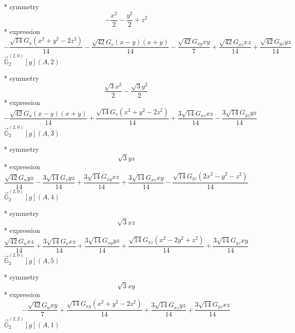 \documentclass[fleqn,8pt]{jsarticle}
\begin{document}
\noindent\quad ** symmetry
\begin{dmath*}
- \frac{x^{2}}{2} - \frac{y^{2}}{2} + z^{2}
\end{dmath*}
\noindent\quad ** expression
\begin{dmath*}
- \frac{\sqrt{14} G_{u} \left(x^{2} + y^{2} - 2 z^{2}\right)}{14} - \frac{\sqrt{42} G_{v} \left(x - y\right) \left(x + y\right)}{14} - \frac{\sqrt{42} G_{xy} x y}{7} + \frac{\sqrt{42} G_{xz} x z}{14} + \frac{\sqrt{42} G_{yz} y z}{14}
\end{dmath*}
\noindent\quad $\vec{\mathbb{G}}_{2}^{(2,0)}[g](A,2)$

\noindent\quad ** symmetry
\begin{dmath*}
\frac{\sqrt{3} x^{2}}{2} - \frac{\sqrt{3} y^{2}}{2}
\end{dmath*}
\noindent\quad ** expression
\begin{dmath*}
- \frac{\sqrt{42} G_{u} \left(x - y\right) \left(x + y\right)}{14} + \frac{\sqrt{14} G_{v} \left(x^{2} + y^{2} - 2 z^{2}\right)}{14} + \frac{3 \sqrt{14} G_{xz} x z}{14} - \frac{3 \sqrt{14} G_{yz} y z}{14}
\end{dmath*}
\noindent\quad $\vec{\mathbb{G}}_{2}^{(2,0)}[g](A,3)$

\noindent\quad ** symmetry
\begin{dmath*}
\sqrt{3} y z
\end{dmath*}
\noindent\quad ** expression
\begin{dmath*}
\frac{\sqrt{42} G_{u} y z}{14} - \frac{3 \sqrt{14} G_{v} y z}{14} + \frac{3 \sqrt{14} G_{xy} x z}{14} + \frac{3 \sqrt{14} G_{xz} x y}{14} - \frac{\sqrt{14} G_{yz} \left(2 x^{2} - y^{2} - z^{2}\right)}{14}
\end{dmath*}
\noindent\quad $\vec{\mathbb{G}}_{2}^{(2,0)}[g](A,4)$

\noindent\quad ** symmetry
\begin{dmath*}
\sqrt{3} x z
\end{dmath*}
\noindent\quad ** expression
\begin{dmath*}
\frac{\sqrt{42} G_{u} x z}{14} + \frac{3 \sqrt{14} G_{v} x z}{14} + \frac{3 \sqrt{14} G_{xy} y z}{14} + \frac{\sqrt{14} G_{xz} \left(x^{2} - 2 y^{2} + z^{2}\right)}{14} + \frac{3 \sqrt{14} G_{yz} x y}{14}
\end{dmath*}
\noindent\quad $\vec{\mathbb{G}}_{2}^{(2,0)}[g](A,5)$

\noindent\quad ** symmetry
\begin{dmath*}
\sqrt{3} x y
\end{dmath*}
\noindent\quad ** expression
\begin{dmath*}
- \frac{\sqrt{42} G_{u} x y}{7} + \frac{\sqrt{14} G_{xy} \left(x^{2} + y^{2} - 2 z^{2}\right)}{14} + \frac{3 \sqrt{14} G_{xz} y z}{14} + \frac{3 \sqrt{14} G_{yz} x z}{14}
\end{dmath*}
\noindent\quad $\vec{\mathbb{G}}_{2}^{(2,2)}[g](A,1)$
\end{document}
